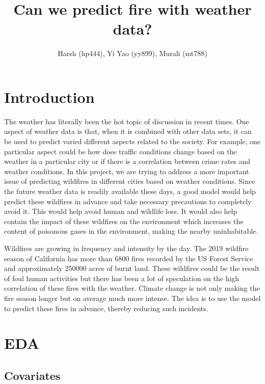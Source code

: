 \documentclass[10pt]{article}
\begin{document}
\title{\bf Can we predict fire with weather data?}
\author{Harsh (hp444), Yi Yao (yy899), Murali (mt788)}
\maketitle

\begin{abstract}
\end{abstract}

\tableofcontents

\section{Introduction}
The weather has literally been the hot topic of discussion in recent times.
One aspect of weather data is that, when it is combined with other data
sets, it can be used to predict varied different aspects related to
the society. For example, one particular aspect could be how does traffic
conditions change based on the weather in a particular city or if there is
a correlation between crime rates and weather conditions. In this project,
we are trying to address a more important issue of predicting wildfires in
different cities based on weather conditions. Since the future weather data
is readily available these days, a good model would help predict these
wildfires in advance and take necessary precautions to completely avoid it.
This would help avoid human and wildlife loss. It would also help contain
the impact of these wildfires on the environment which increases the
content of poisonous gases in the environment, making the nearby
uninhabitable.\par
Wildfires are growing in frequency and intensity by the day. The 2019
wildfire season of California has more than 6800 fires recorded by the US
Forest Service and approximately 250000 acres of burnt land. These
wildfires could be the result of foul human activities but there has been
a lot of speculation on the high correlation of these fires with the
weather. Climate change is not only making the fire season longer but on
average much more intense. The idea is to use the model to predict these
fires in advance, thereby reducing such incidents.\par
\section{EDA}
\subsection{Covariates}
\end{document}
